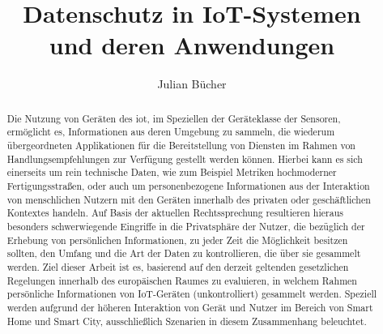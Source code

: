 \documentclass[
runningheads,
]{llncs}
\begin{document}

\title{Datenschutz in IoT-Systemen \\und deren Anwendungen}
%
%
\author{Julian Bücher}
%
%
%
\maketitle              %


\begin{abstract}
Die Nutzung von Geräten des \ac{iot}, im Speziellen der Geräteklasse der Sensoren, ermöglicht es, Informationen aus deren Umgebung zu sammeln, die wiederum übergeordneten Applikationen für die Bereitstellung von Diensten im Rahmen von Handlungsempfehlungen zur Verfügung gestellt werden können.
Hierbei kann es sich einerseits um rein technische Daten, wie zum Beispiel Metriken hochmoderner Fertigungsstraßen, oder auch um personenbezogene Informationen aus der Interaktion von menschlichen Nutzern mit den Geräten innerhalb des privaten oder geschäftlichen Kontextes handeln. 
Auf Basis der aktuellen Rechtssprechung resultieren hieraus besonders schwerwiegende Eingriffe in die Privatsphäre der Nutzer, die bezüglich der Erhebung von persönlichen Informationen, zu jeder Zeit die Möglichkeit besitzen sollten, den Umfang und die Art der Daten zu kontrollieren, die über sie gesammelt werden.
Ziel dieser Arbeit ist es, basierend auf den derzeit geltenden gesetzlichen Regelungen innerhalb des europäischen Raumes zu evaluieren, in welchem Rahmen persönliche Informationen von IoT-Geräten (unkontrolliert) gesammelt werden.
Speziell werden aufgrund der höheren Interaktion von Gerät und Nutzer im Bereich von Smart Home und Smart City, ausschließlich Szenarien in diesem Zusammenhang beleuchtet.

\end{abstract}
\end{document}
